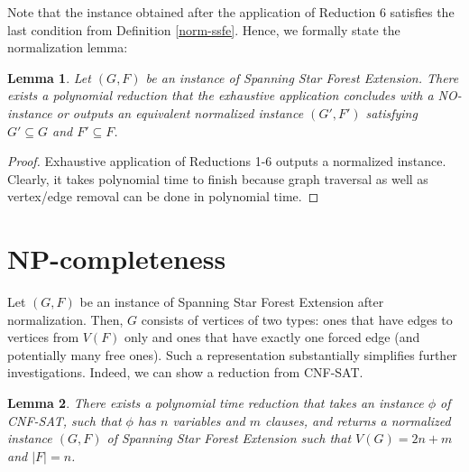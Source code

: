\documentclass[en]{pracamgr}
\newtheorem{lemma}{Lemma}
\newcommand{\ssfep}{{\sc Spanning Star Forest Extension}}
\newcommand{\cnfsat}{{\sc CNF-SAT}}
\begin{document}
Note that the instance obtained after the application of Reduction 6 satisfies the last condition from Definition \ref{norm-ssfe}. Hence, we formally state the normalization lemma:

\begin{lemma}
	Let $(G,F)$ be an instance of \ssfep{}. There exists a polynomial reduction that the exhaustive application concludes with a NO-instance or outputs an equivalent normalized instance $(G',F')$ satisfying $G' \subseteq G$ and $F' \subseteq F$.
\end{lemma}

\begin{proof}
	Exhaustive application of Reductions 1-6 outputs a normalized instance. Clearly, it takes polynomial time to finish because graph traversal as well as vertex/edge removal can be done in polynomial time.
\end{proof}

\section{NP-completeness}

Let $(G,F)$ be an instance of \ssfep{} after normalization. Then, $G$ consists of vertices of two types: ones that have edges to vertices from $V(F)$ only and ones that have exactly one forced edge (and potentially many free ones). Such a representation substantially simplifies further investigations. Indeed, we can show a reduction from \cnfsat{}.

\begin{lemma}\label{ssfep reduction}
	There exists a polynomial time reduction that takes an instance $\phi$ of \cnfsat{}, such that $\phi$ has $n$ variables and $m$ clauses, and returns a normalized instance $(G,F)$ of \ssfep{} such that $V(G)=2n+m$ and $|F|=n$.
\end{lemma}
\end{document}
